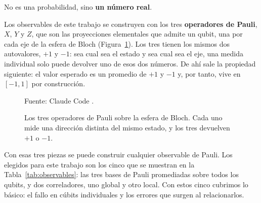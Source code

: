 \noindent No es una probabilidad, sino \textbf{un número real}.

Los observables de este trabajo se construyen con los tres \textbf{operadores de Pauli}, $X$,
$Y$ y $Z$, que son las proyecciones elementales que admite un qubit, una por cada eje de la esfera
de Bloch (Figura~\ref{fig:pauli}). Los tres tienen los mismos dos autovalores, $+1$ y $-1$: sea
cual sea el estado y sea cual sea el eje, una medida individual solo puede devolver uno
de esos dos números. De ahí sale la propiedad siguiente: el
valor esperado es un promedio de $+1$ y $-1$ y, por tanto, vive en $[-1,1]$ por construcción.

\begin{figure}[htbp]
    \centering
    \caption{Los tres operadores de Pauli sobre la esfera de Bloch. Cada uno mide una
             dirección distinta del mismo estado, y los tres devuelven $+1$ o $-1$.}
    \label{fig:pauli}

    

    {\footnotesize Fuente: Claude Code \cite{anthropic_claude}.}
\end{figure}

Con esas tres piezas se puede construir cualquier observable de Pauli. Los elegidos para este trabajo son los cinco que se muestran en la Tabla~\ref{tab:observables}: las tres bases de Pauli promediadas sobre todos
los qubits, y dos correladores, uno global y otro local. Con estos cinco cubrimos lo básico: el fallo en cúbits individuales y los errores que surgen al relacionarlos.

